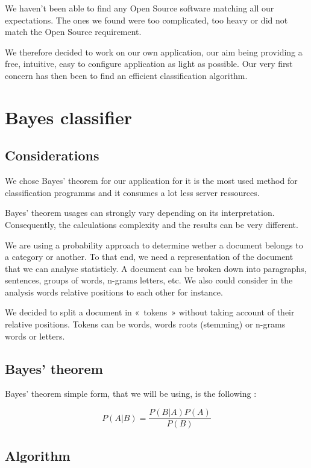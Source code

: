 \documentclass[a4paper,11pt]{article}
\begin{document}
We haven't been able to find any Open Source software matching all our
expectations. The ones we found were too complicated, too heavy or did not
match the Open Source requirement.

We therefore decided to work on our own application, our aim being providing
a free, intuitive, easy to configure application as light as possible. Our
very first concern has then been to find an efficient classification
algorithm.


\section{Bayes classifier}

\subsection{Considerations}

We chose Bayes' theorem for our application for it is the most used method for
classification programms and it consumes a lot less server ressources.

Bayes' theorem usages can strongly vary depending on its interpretation.
Consequently, the calculations complexity and the results can be very
different.

We are using a probability approach to determine wether a document belongs to
a category or another. To that end, we need a representation of the document
that we can analyse statisticly. A document can be broken down into
paragraphs, sentences, groups of words, n-grams letters, etc. We also could
consider in the analysis words relative positions to each other for instance.

We decided to split a document in «~tokens~» without taking account of their
relative positions. Tokens can be words, words roots (stemming) or n-grams
words or letters.

\subsection{Bayes' theorem}

Bayes' theorem simple form, that we will be using, is the following :

\begin{equation}
    P(A| B) = \frac{P(B | A) P(A)}{P(B)}
\end{equation}


\subsection{Algorithm}
\end{document}
